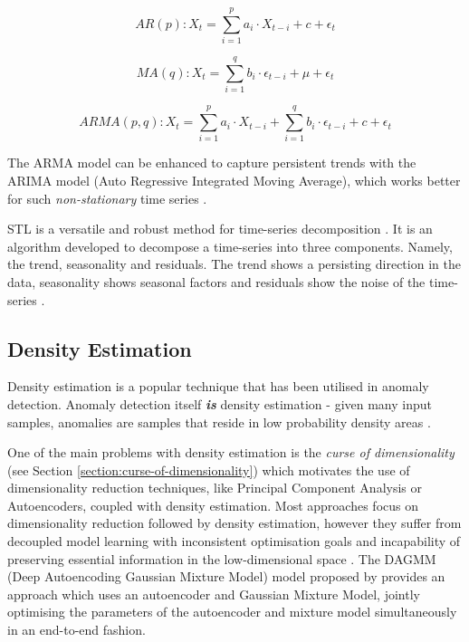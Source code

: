 \documentclass{mpaper}
\begin{document}
$$ AR(p): X_t = \sum_{i=1}^{p} a_i \cdot X_{t-i} + c + \epsilon_t $$ 
\citep{outlierAnalysisBook}

$$ MA(q): X_t = \sum_{i=1}^{q} b_i \cdot \epsilon_{t-i} + \mu + \epsilon_t $$ 
\citep{outlierAnalysisBook}

$$ ARMA(p, q): X_t = \sum_{i=1}^{p} a_i \cdot X_{t-i} + \sum_{i=1}^{q} b_i \cdot \epsilon_{t-i} + c + \epsilon_t $$ 
\citep{outlierAnalysisBook}

The ARMA model can be enhanced to capture persistent trends with the ARIMA model (Auto Regressive Integrated Moving Average), which works better for such \textit{non-stationary} time series \citep{outlierAnalysisBook}.

STL is a versatile and robust method for time-series decomposition \citep{ADSaS}. It is an algorithm developed to decompose a time-series into three components. Namely, the trend, seasonality and residuals. The trend shows a persisting direction in the data, seasonality shows seasonal factors and residuals show the noise of the time-series \citep{ADSaS}.


\subsection{Density Estimation}

Density estimation is a popular technique that has been utilised in anomaly detection. Anomaly detection itself \textbf{\textit{is}} density estimation - given many input samples, anomalies are samples that reside in low probability density areas \citep{DAGMM}.

One of the main problems with density estimation is the \textit{curse of dimensionality} (see Section 
\ref{section:curse-of-dimensionality}) which motivates the use of dimensionality reduction techniques, like Principal Component Analysis or Autoencoders, coupled with density estimation. Most approaches focus on dimensionality reduction followed by density estimation, however they suffer from decoupled model learning with inconsistent optimisation goals and incapability of preserving essential information in the low-dimensional space \citep{DAGMM}. The DAGMM (Deep Autoencoding Gaussian Mixture Model) model proposed by \cite{DAGMM} provides an approach which uses an autoencoder and Gaussian Mixture Model, jointly optimising the parameters of the autoencoder and mixture model simultaneously in an end-to-end fashion.
\end{document}
